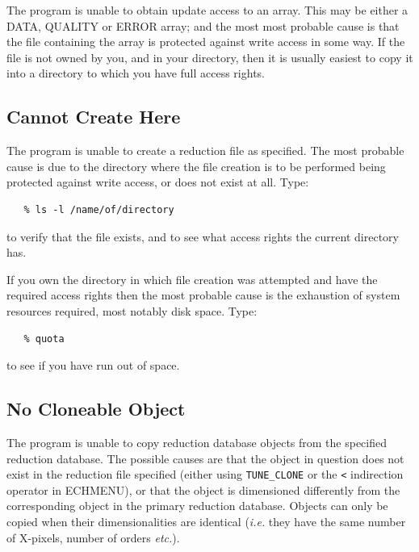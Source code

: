 \documentclass[11pt,twoside]{article}
\newcommand{\xlabel}[1]{}
\newcommand{\mlabel}[1]{\xlabel{#1}\label{#1}}
\newcommand{\myindex}[1]{\index{#1}}
\renewcommand{\myindex}[1]{}
\begin{document}
The program is unable to obtain update access to an array. This may be
either a DATA, QUALITY or ERROR array; and the most most probable cause
is that the file containing the array is protected against write access
in some way.  If the file is not owned by you, and in your directory,
then it is usually easiest to copy it into a directory to which you have
full access rights.


\subsection{\mlabel{cannot_create_here} Cannot Create Here}

The program is unable to create a reduction file as specified. The most
probable cause is due to the directory where the file creation is to be
performed being protected against write access, or does not exist at
all. Type:

\begin{verbatim}
   % ls -l /name/of/directory
\end{verbatim}

to verify that the file exists, and to see what access rights the
current directory has.

If you own the directory in which file creation was attempted and have
the required access rights  then the most probable cause is the
exhaustion of system resources required, most notably disk space.
Type:

\begin{verbatim}
   % quota
\end{verbatim}

to see if you have run out of space.


\subsection{\mlabel{no_cloneable_object} No Cloneable Object}
\myindex{Cloning!failure}

The program is unable to copy reduction database objects from the
specified reduction database.  The possible causes are that the
object in question does not exist in the reduction file specified
(either using \texttt{TUNE\_CLONE} or the \texttt{<} indirection operator in
ECHMENU), or that the object is dimensioned differently from the
corresponding object in the primary reduction database. Objects
can only be copied when their dimensionalities are identical ({\it{i.e.}} they
have the same number of X-pixels, number of orders {\it etc.}).
\end{document}
